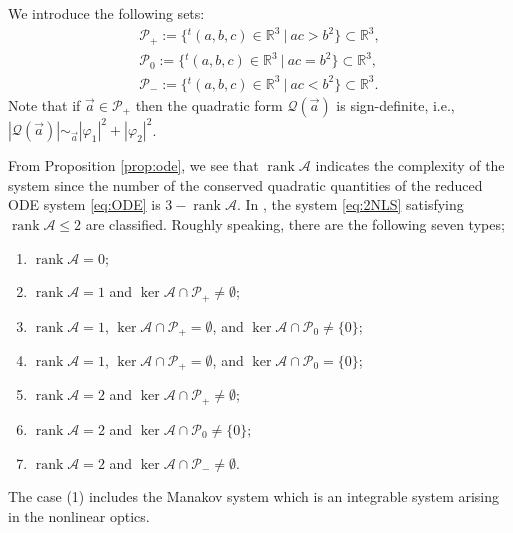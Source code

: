 \documentclass[11pt,a4paper,twosides]{amsart}
\theoremstyle{plain}
\theoremstyle{remark}
\numberwithin{equation}{section}
\newcommand{\R}{\mathbb{R}}
\def\le{\leqslant}
\DeclareMathOperator{\rank}{rank}
\theoremstyle{definition}
\newcommand{\1}{{\bf 1}_{\{|x| < |t|\}}}
\begin{document}
We introduce the following sets:
\begin{equation}
\begin{aligned}
	\mathcal{P}_+ := \{ {}^t\!(a,b,c) \in \R^3 \ |\ ac>b^2\} \subset \R^3,\\
	\mathcal{P}_0 := \{ {}^t\!(a,b,c) \in \R^3 \ |\ ac=b^2\} \subset \R^3,\\
	\mathcal{P}_- := \{ {}^t\!(a,b,c) \in \R^3 \ |\ ac<b^2\} \subset \R^3.
\end{aligned}
\end{equation}
Note that if $\vec{a} \in \mathcal{P}_+$ then the quadratic form $\mathcal{Q}(\vec{a})$
is sign-definite, i.e., $|\mathcal{Q}(\vec{a})| \sim_{\vec{a}} |\varphi_1|^2 + |\varphi_2|^2$.


From Proposition \ref{prop:ode}, we see that $\rank \mathscr{A}$ indicates the complexity of the system since
the number of the conserved quadratic quantities of the reduced ODE system \eqref{eq:ODE}
is $3 - \rank \mathscr{A}$. 
In \cite{MaSeUr2,Ma}, 
the system \eqref{eq:2NLS} satisfying $\rank \mathscr{A}\le 2$ are classified.
Roughly speaking, there are the following seven types;
\begin{enumerate}
\item $\rank \mathscr{A}=0$;
\item $\rank \mathscr{A}=1$ and $\ker \mathscr{A} \cap \mathcal{P}_+\neq \emptyset$;
\item $\rank \mathscr{A}=1$, $\ker \mathscr{A} \cap \mathcal{P}_+= \emptyset$, and $\ker \mathscr{A} \cap \mathcal{P}_0\neq \{0\}$;
\item $\rank \mathscr{A}=1$, $\ker \mathscr{A} \cap \mathcal{P}_+= \emptyset$, and $\ker \mathscr{A} \cap \mathcal{P}_0= \{0\}$;
\item
$\rank \mathscr{A}=2$ and $\ker \mathscr{A} \cap \mathcal{P}_+\neq \emptyset$;
\item
$\rank \mathscr{A}=2$ and $\ker \mathscr{A} \cap \mathcal{P}_0\neq \{0\}$;
\item
$\rank \mathscr{A}=2$ and $\ker \mathscr{A} \cap \mathcal{P}_-\neq \emptyset$.
\end{enumerate}
The case (1) includes the Manakov system \cite{Manakov} 
which is an integrable system arising in the nonlinear optics.
\end{document}

